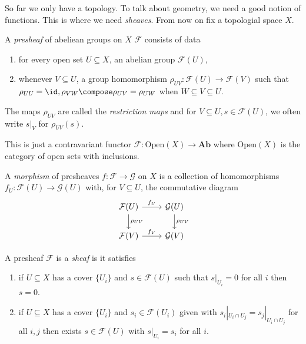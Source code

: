 \documentclass[a4paper]{article}
\renewcommand{\c}[1]{\mathbf{#1}} %
\newcommand{\sh}[1]{\mathcal{#1}} %
\begin{document}
So far we only have a topology. To talk about geometry, we need a good notion of functions. This is where we need \emph{sheaves}. From now on fix a topologial space \(X\).

\begin{definition}[presheaf]
  A \emph{presheaf} of abeliean groups on \(X\) \(\sh F\) consists of data
  \begin{enumerate}
  \item for every open set \(U \subseteq X\), an abelian group \(\sh F(U)\),
  \item whenever \(V \subseteq U\), a group homomorphism \(\rho_{UV}: \sh F(U) \to \sh F(V)\) such that \(\rho_{UU} = \id, \rho_{VW} \compose \rho_{UV} = \rho_{UW}\) when \(W \subseteq V \subseteq U\).
  \end{enumerate}
\end{definition}

The maps \(\rho_{UV}\) are called the \emph{restriction maps} and for \(V \subseteq U, s \in \sh F(U)\), we often write \(s|_V\) for \(\rho_{UV}(s)\).

\begin{remark}
  This is just a contravariant functor \(\sh F: \text{Open}(X) \to \c{Ab}\) where \(\text{Open}(X)\) is the category of open sets with inclusions.
\end{remark}

\begin{definition}
  A \emph{morphism} of presheaves \(f: \sh F \to \sh G\) on \(X\) is a collection of homomorphisms \(f_U: \sh F(U) \to \sh G(U)\) with, for \(V \subseteq U\), the commutative diagram
  \[
    \begin{tikzcd}
      \sh F(U) \ar[r, "f_U"] \ar[d, "\rho_{UV}"] & \sh G(U) \ar[d, "\rho_{UV}"] \\
      \sh F(V) \ar[r, "f_V"] & \sh G(V)
    \end{tikzcd}
  \]
\end{definition}

\begin{definition}[sheaf]
  A presheaf \(\sh F\) is a \emph{sheaf} is it satisfies
  \begin{enumerate}
  \item if \(U \subseteq X\) has a cover \(\{U_i\}\) and \(s \in \sh F(U)\) such that \(s|_{U_i} = 0\) for all \(i\) then \(s = 0\).
  \item if \(U \subseteq X\) has a cover \(\{U_i\}\) and \(s_i \in \sh F(U_i)\) given with \(s_i|_{U_i \cap U_j} = s_j|_{U_i \cap U_j}\) for all \(i, j\) then exists \(s \in \sh F(U)\) with \(s|_{U_i} = s_i\) for all \(i\).
  \end{enumerate}
\end{definition}
\end{document}
